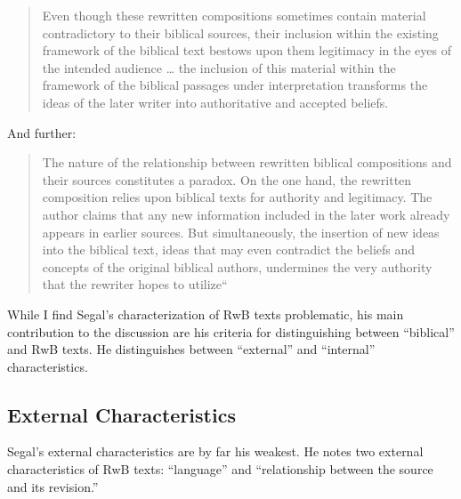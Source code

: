 \begin{quote}
Even though these rewritten compositions sometimes contain material
contradictory to their biblical sources, their inclusion within the
existing framework of the biblical text bestows upon them legitimacy in
the eyes of the intended audience \ldots{} the inclusion of this
material within the framework of the biblical passages under
interpretation transforms the ideas of the later writer into
authoritative and accepted beliefs.\autocite[11]{segal_henze2005}
\end{quote}

And further:

\begin{quote}
The nature of the relationship between rewritten biblical compositions
and their sources constitutes a paradox. On the one hand, the rewritten
composition relies upon biblical texts for authority and legitimacy. The
author claims that any new information included in the later work
already appears in earlier sources. But simultaneously, the insertion of
new ideas into the biblical text, ideas that may even contradict the
beliefs and concepts of the original biblical authors, undermines the
very authority that the rewriter hopes to
utilize``\autocite[11-12]{segal_henze2005}
\end{quote}

While I find Segal's characterization of RwB texts problematic, his main
contribution to the discussion are his criteria for distinguishing
between ``biblical'' and RwB texts. He distinguishes between
``external'' and ``internal'' characteristics.

\subsection{External Characteristics}\label{external-characteristics}

Segal's external characteristics are by far his weakest. He notes two
external characteristics of RwB texts: ``language'' and ``relationship
between the source and its revision.''

